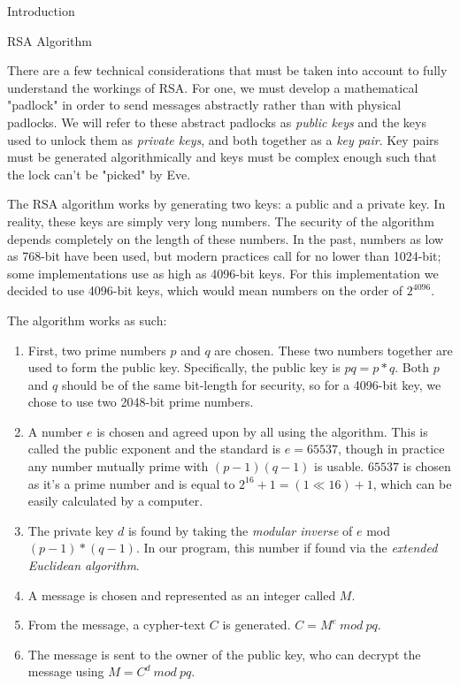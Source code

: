 \documentclass[landscape,fontscale=.8,paperwidth=24in,paperheight=18in]{baposter} %
\begin{document}
\begin{poster}
\begin{posterbox}[name=intro,column=0,below=objectives, span=13]{Introduction}
\end{posterbox}


\begin{posterbox}[name=rsa,column=13,row=0,span=17]{RSA Algorithm} %

There are a few technical considerations that must be taken into account to fully understand the workings of RSA. For one, we must develop a mathematical "padlock" in order to send messages abstractly rather than with physical padlocks. We will refer to these abstract padlocks as \emph{public keys} and the keys used to unlock them as \emph{private keys}, and both together as a \emph{key pair}. Key pairs must be generated algorithmically and keys must be complex enough such that the lock can't be "picked" by Eve.

The RSA algorithm works by generating two keys: a public and a private key. In reality, these keys are simply very long numbers. The security of the algorithm depends completely on the length of these numbers. In the past, numbers as low as 768-bit have been used, but modern practices call for no lower than 1024-bit; some implementations use as high as 4096-bit keys. For this implementation we decided to use 4096-bit keys, which would mean numbers on the order of $2^{4096}$.

The algorithm works as such:
\begin{enumerate}
	\item First, two prime numbers $p$ and $q$ are chosen. These two numbers together are used to form the public key. Specifically, the public key is ${pq = p * q}$. Both $p$ and $q$ should be of the same bit-length for security, so for a 4096-bit key, we chose to use two 2048-bit prime numbers. 
	\item A number $e$ is chosen and agreed upon by all using the algorithm. This is called the public exponent and the standard is $e = 65537$, though in practice any number mutually prime with ${(p-1)(q-1)}$ is usable. $65537$ is chosen as it's a prime number and is equal to ${2^{16}+1 = (1 \ll 16) + 1}$, which can be easily calculated by a computer.
	\item The private key $d$ is found by taking the \emph{modular inverse} of $e$ mod ${(p-1)*(q-1)}$. In our program, this number if found via the \emph{extended Euclidean algorithm}.
	\item A message is chosen and represented as an integer called $M$.
	\item From the message, a cypher-text $C$ is generated. $C = M^e\ mod\ pq$.
	\item The message is sent to the owner of the public key, who can decrypt the message using $M = C^d\ mod\ pq$.
\end{enumerate}


\end{posterbox}
\end{poster}
\end{document}
